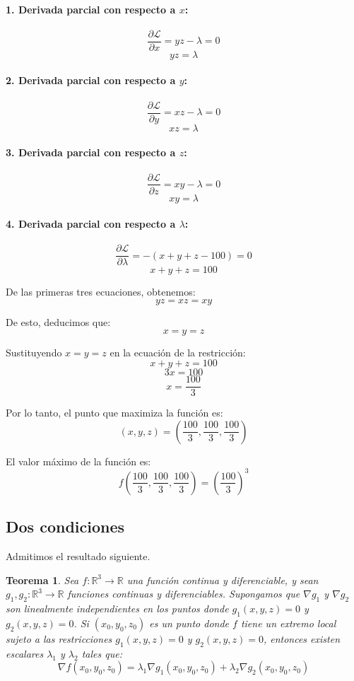 \documentclass[11pt]{book}
\theoremstyle{definicion}
\theoremstyle{teorema}
\newtheorem{teorema}{Teorema}[section]
\theoremstyle{ejemplo}
\begin{document}
\paragraph{1. Derivada parcial con respecto a \(x\):}
\[ \frac{\partial \mathcal{L}}{\partial x} = yz - \lambda = 0 \]
\[ yz = \lambda \]

\paragraph{2. Derivada parcial con respecto a \(y\):}
\[ \frac{\partial \mathcal{L}}{\partial y} = xz - \lambda = 0 \]
\[ xz = \lambda \]

\paragraph{3. Derivada parcial con respecto a \(z\):}
\[ \frac{\partial \mathcal{L}}{\partial z} = xy - \lambda = 0 \]
\[ xy = \lambda \]

\paragraph{4. Derivada parcial con respecto a \(\lambda\):}
\[ \frac{\partial \mathcal{L}}{\partial \lambda} = -(x + y + z - 100) = 0 \]
\[ x + y + z = 100 \]

De las primeras tres ecuaciones, obtenemos:
\[ yz = xz = xy \]

De esto, deducimos que:
\[ x = y = z \]

Sustituyendo \( x = y = z \) en la ecuación de la restricción:
\[ x + y + z = 100 \]
\[ 3x = 100 \]
\[ x = \frac{100}{3} \]

Por lo tanto, el punto que maximiza la función es:
\[ (x, y, z) = \left( \frac{100}{3}, \frac{100}{3}, \frac{100}{3} \right) \]

El valor máximo de la función es:
\[ f\left( \frac{100}{3}, \frac{100}{3}, \frac{100}{3} \right) = \left( \frac{100}{3} \right)^3 \]

\subsection{Dos condiciones}

\noindent
Admitimos el resultado siguiente.

\begin{teorema}
Sea \( f: \mathbb{R}^3 \to \mathbb{R} \) una función continua y diferenciable, y sean \( g_1, g_2: \mathbb{R}^3 \to \mathbb{R} \) funciones continuas y diferenciables. Supongamos que \( \nabla g_1 \) y \( \nabla g_2 \) son linealmente independientes en los puntos donde \( g_1(x, y, z) = 0 \) y \( g_2(x, y, z) = 0 \).
%
Si \( (x_0, y_0, z_0) \) es un punto donde \( f \) tiene un extremo local sujeto a las restricciones \( g_1(x, y, z) = 0 \) y \( g_2(x, y, z) = 0 \), entonces existen escalares \( \lambda_1 \) y \( \lambda_2 \) tales que:
%
\[ \nabla f(x_0, y_0, z_0) = \lambda_1 \nabla g_1(x_0, y_0, z_0) + \lambda_2 \nabla g_2(x_0, y_0, z_0) \]
\end{teorema}
\end{document}
